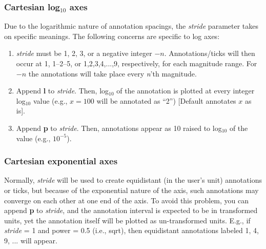 
\subsubsection{Cartesian log$_{10}$ axes}

Due to the logarithmic nature of annotation spacings, the \emph{stride} parameter takes on specific
meanings.  The following concerns are specific to log axes:

\begin{enumerate}
\item \emph{stride} must be 1, 2, 3, or a negative integer $-n$.  Annotations/ticks will
then occur at 1, 1--2--5, or 1,2,3,4,...,9, respectively, for each magnitude range.
For $-n$ the annotations will take place every \emph{n}'th magnitude.

\item Append \textbf{l} to \emph{stride}. Then, log$_{10}$ of the annotation
is plotted at every integer log$_{10}$ value (e.g., $x = 100$ will be annotated as ``2'')
[Default annotates $x$ as is].

\item Append \textbf{p} to \emph{stride}.  Then, annotations appear as 10
raised to log$_{10}$ of the value (e.g., $10^{-5}$).

\end{enumerate}


\subsubsection{Cartesian exponential axes}
Normally, \emph{stride} will be used to create equidistant (in the user's unit) annotations
or ticks, but because of the exponential nature of the axis, such annotations may converge
on each other at one end of the axis.  To avoid this problem, you can
append \textbf{p }to \emph{stride}, and the annotation
interval is expected to be in transformed units, yet the annotation itself will be plotted
as un-transformed units.  E.g., if \emph{stride} = 1 and power = 0.5 (i.e., sqrt),
then equidistant annotations labeled 1, 4, 9, ... will appear.

